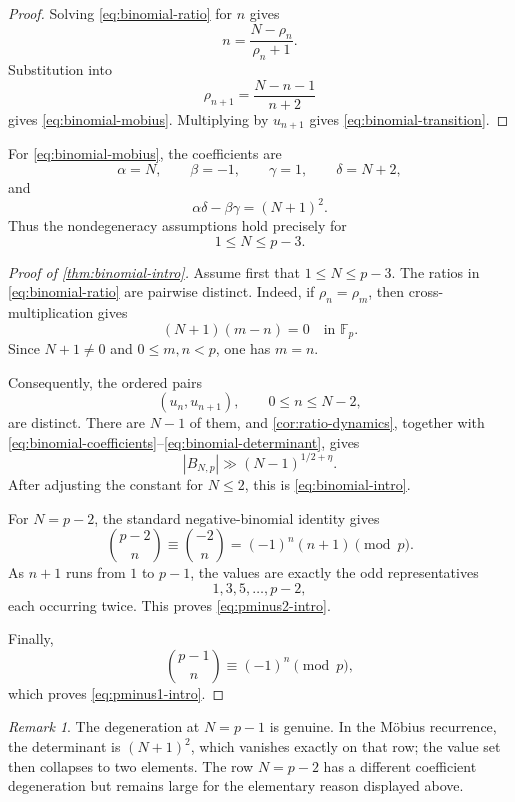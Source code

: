 \documentclass[11pt,reqno]{amsart}
\numberwithin{equation}{section}
\theoremstyle{definition}
\theoremstyle{remark}
\newtheorem{remark}[remark]{Remark}
\newcommand{\F}{\mathbb F}
\begin{document}
\begin{proof}
Solving \eqref{eq:binomial-ratio} for $n$ gives
\[
  n=\frac{N-\rho_n}{\rho_n+1}.
\]
Substitution into
\[
  \rho_{n+1}=\frac{N-n-1}{n+2}
\]
gives \eqref{eq:binomial-mobius}.  Multiplying by $u_{n+1}$ gives \eqref{eq:binomial-transition}.
\end{proof}

For \eqref{eq:binomial-mobius}, the coefficients are
\begin{equation}\label{eq:binomial-coefficients}
  \alpha=N,
  \qquad \beta=-1,
  \qquad \gamma=1,
  \qquad \delta=N+2,
\end{equation}
and
\begin{equation}\label{eq:binomial-determinant}
  \alpha\delta-\beta\gamma=(N+1)^2.
\end{equation}
Thus the nondegeneracy assumptions hold precisely for
\[
  1\le N\le p-3.
\]

\begin{proof}[Proof of \cref{thm:binomial-intro}]
Assume first that $1\le N\le p-3$.  The ratios in \eqref{eq:binomial-ratio} are pairwise distinct.  Indeed, if $\rho_n=\rho_m$, then cross-multiplication gives
\[
  (N+1)(m-n)=0\quad\text{in }\F_p.
\]
Since $N+1\ne0$ and $0\le m,n<p$, one has $m=n$.

Consequently, the ordered pairs
\[
  (u_n,u_{n+1}),
  \qquad 0\le n\le N-2,
\]
are distinct.  There are $N-1$ of them, and \cref{cor:ratio-dynamics}, together with \eqref{eq:binomial-coefficients}--\eqref{eq:binomial-determinant}, gives
\[
  |B_{N,p}|\gg (N-1)^{1/2+\eta}.
\]
After adjusting the constant for $N\le2$, this is \eqref{eq:binomial-intro}.

For $N=p-2$, the standard negative-binomial identity gives
\[
  \binom{p-2}{n}\equiv\binom{-2}{n}=(-1)^n(n+1)\pmod p.
\]
As $n+1$ runs from $1$ to $p-1$, the values are exactly the odd representatives
\[
  1,3,5,\ldots,p-2,
\]
each occurring twice.  This proves \eqref{eq:pminus2-intro}.

Finally,
\[
  \binom{p-1}{n}\equiv(-1)^n\pmod p,
\]
which proves \eqref{eq:pminus1-intro}.
\end{proof}

\begin{remark}
The degeneration at $N=p-1$ is genuine.  In the M\"obius recurrence, the determinant is $(N+1)^2$, which vanishes exactly on that row; the value set then collapses to two elements.  The row $N=p-2$ has a different coefficient degeneration but remains large for the elementary reason displayed above.
\end{remark}
\end{document}
